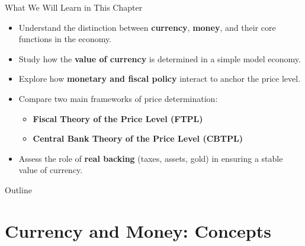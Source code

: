 \documentclass[11pt,aspectratio=169]{beamer}
\begin{document}
\begin{frame}{What We Will Learn in This Chapter}
\small
\begin{itemize}
  \item Understand the distinction between \textbf{currency}, \textbf{money}, and their core functions in the economy.
  
  \vspace{0.2cm}
  \item Study how the \textbf{value of currency} is determined in a simple model economy.
  
  \vspace{0.2cm}
  \item Explore how \textbf{monetary and fiscal policy} interact to anchor the price level.
  
  \vspace{0.2cm}
  \item Compare two main frameworks of price determination:
  \begin{itemize}
      \item \textbf{Fiscal Theory of the Price Level (FTPL)}  
      \item \textbf{Central Bank Theory of the Price Level (CBTPL)}
  \end{itemize}
  
  \vspace{0.2cm}
  \item Assess the role of \textbf{real backing} (taxes, assets, gold) in ensuring a stable value of currency.
\end{itemize}
\end{frame}


\begin{frame}{Outline}
\tableofcontents
\end{frame}

\section{Currency and Money: Concepts}
\end{document}

